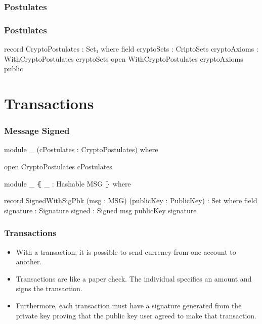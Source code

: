 \documentclass{beamer}
\begin{document}
\begin{frame}
  \frametitle{Postulates}
\end{frame}

\begin{frame}
  \frametitle{Postulates}
\begin{code}
record CryptoPostulates : Set₁ where
  field
    cryptoSets : CriptoSets
    cryptoAxioms : WithCryptoPostulates cryptoSets
  open WithCryptoPostulates cryptoAxioms public

\end{code}
\end{frame}

\section{Transactions}

\begin{frame}
  \frametitle{Message Signed}
\begin{code}
module _ (cPostulates : CryptoPostulates) where

  open CryptoPostulates cPostulates

  module _ ⦃ _ : Hashable MSG ⦄ where

    record SignedWithSigPbk  (msg : MSG)
      (publicKey : PublicKey) : Set where
      field
        signature : Signature
        signed    : Signed msg publicKey signature

\end{code}
\end{frame}

\begin{frame}
   \frametitle{Transactions}
   \begin{itemize}[<+->]
     \item With a transaction, it is possible to send currency from one account to another.
     \item Transactions are like a paper check. The individual specifies an amount and signs the transaction.
    \item Furthermore, each transaction must have a signature generated from the private key proving that the public key user agreed to make that transaction.
   \end{itemize}
\end{frame}
\end{document}
